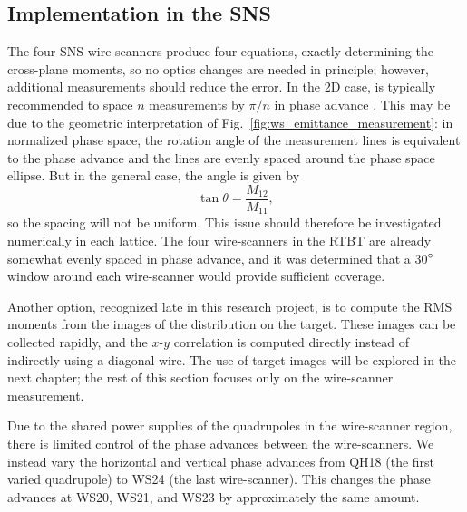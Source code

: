 \subsection{Implementation in the SNS}

The four SNS wire-scanners produce four equations, exactly determining the cross-plane moments, so no optics changes are needed in principle; however, additional measurements should reduce the error. In the 2D case, is typically recommended to space $n$ measurements by $\pi / n$ in phase advance \cite{book:Minty2003}. This may be due to the geometric interpretation of Fig.~\ref{fig:ws_emittance_measurement}: in normalized phase space, the rotation angle of the measurement lines is equivalent to the phase advance and the lines are evenly spaced around the phase space ellipse. But in the general case, the angle is given by \cite{Hock2011}
%
\begin{equation}
    \tan\theta = \frac{M_{12}}{M_{11}},
\end{equation}
%
so the spacing will not be uniform. This issue should therefore be investigated numerically in each lattice. The four wire-scanners in the RTBT are already somewhat evenly spaced in phase advance, and it was determined that a 30$\degree$ window around each wire-scanner would provide sufficient coverage. 

Another option, recognized late in this research project, is to compute the RMS moments from the images of the distribution on the target. These images can be collected rapidly, and the $x$-$y$ correlation is computed directly instead of indirectly using a diagonal wire. The use of target images will be explored in the next chapter; the rest of this section focuses only on the wire-scanner measurement.

Due to the shared power supplies of the quadrupoles in the wire-scanner region, there is limited control of the phase advances between the wire-scanners. We instead vary the horizontal and vertical phase advances from QH18 (the first varied quadrupole) to WS24 (the last wire-scanner). This changes the phase advances at WS20, WS21, and WS23 by approximately the same amount. 

